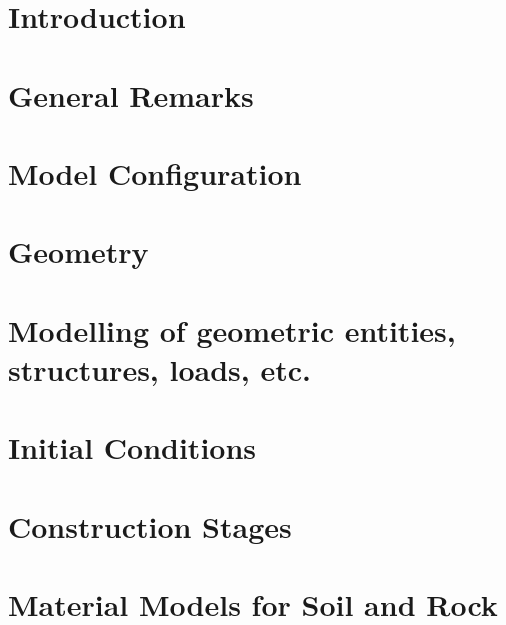 \documentclass[12pt]{report}
\title{\varTitle}
\author{\varAuthors}
\date{\varDate}
\begin{document}
%

\setlength{\aweboxcontentwidth}{0.81\linewidth}



\tableofcontents

\chapter{Introduction}
\label{chap:introduction}


\chapter{General Remarks}
\label{chap:general}


\chapter{Model Configuration}
\label{chap:setup}


\chapter{Geometry}
\label{chap:geometry}


\chapter{Modelling of geometric entities, structures, loads, etc.}
\label{chap:entities}


\chapter{Initial Conditions}
\label{chap:initial}


\chapter{Construction Stages}
\label{chap:stages}


\chapter{Material Models for Soil and Rock}
\label{chap:materials}

\end{document}
